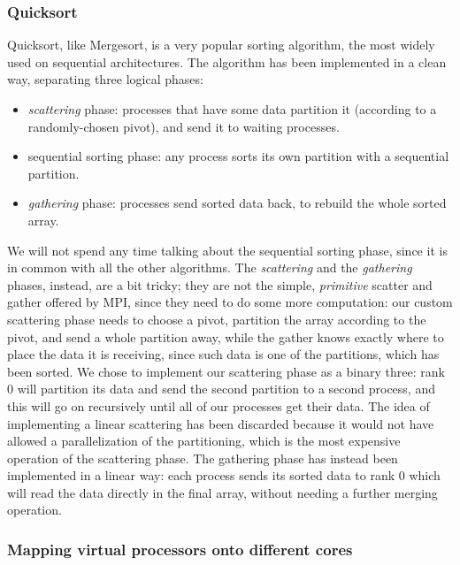 \subsubsection{Quicksort}
Quicksort, like Mergesort, is a very popular sorting algorithm, the most widely used on sequential architectures. The algorithm has been implemented in a clean way, separating three logical phases:
\begin{itemize}
	\item{\textit{scattering} phase: processes that have some data partition it (according to a randomly-chosen pivot), and send it to waiting processes.}
	\item{sequential sorting phase: any process sorts its own partition with a sequential partition.}
	\item{\textit{gathering} phase: processes send sorted data back, to rebuild the whole sorted array.}
\end{itemize}
We will not spend any time talking about the sequential sorting phase, since it is in common with all the other algorithms.
The \textit{scattering} and the \textit{gathering} phases, instead, are a bit tricky; they are not the simple, \textit{primitive} scatter and gather offered by MPI, since they need to do some more computation: our custom scattering phase needs to choose a pivot, partition the array according to the pivot, and send a whole partition away, while the gather knows exactly where to place the data it is receiving, since such data is one of the partitions, which has been sorted.
We chose to implement our scattering phase as a binary three: rank 0 will partition its data and send the second partition to a second process, and this will go on recursively until all of our processes get their data. The idea of implementing a linear scattering has been discarded because it would not have allowed a parallelization of the partitioning, which is the most expensive operation of the scattering phase.
The gathering phase has instead been implemented in a linear way: each process sends its sorted data to rank 0 which will read the data directly in the final array, without needing a further merging operation.

\subsubsection*{Mapping virtual processors onto different cores}  
